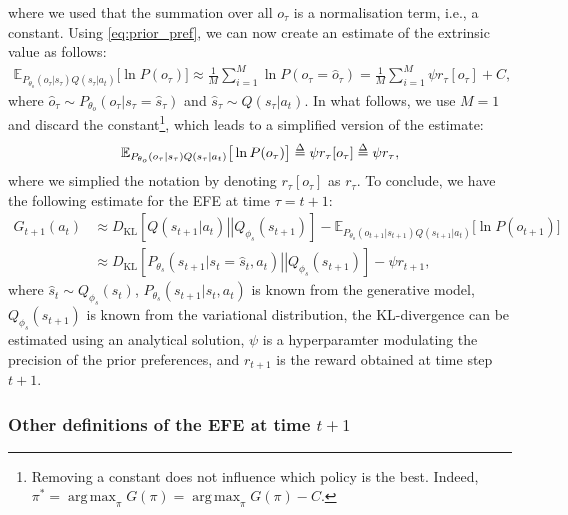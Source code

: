 \documentclass[twoside,11pt]{article}
\newcommand{\kl}[2]{D_{\mathrm{KL}} \left[ \left. \left. #1 \right|\right| #2 \right] }
\DeclareMathOperator*{\argmax}{arg\,max}
\def\delequal{\mathrel{\ensurestackMath{\stackon[1pt]{=}{\scriptstyle\Delta}}}}
\begin{document}
where we used that the summation over all $o_\tau$ is a normalisation term, i.e., a constant. Using \eqref{eq:prior_pref}, we can now create an estimate of the extrinsic value as follows:
\begin{align*}
\mathbb{E}_{P_{\theta_o}(o_\tau|s_\tau)Q(s_\tau | a_t)}\big[\ln P(o_\tau)\big] \approx \frac{1}{M} \sum_{i = 1}^M \ln P(o_\tau = \hat{o}_\tau) = \frac{1}{M} \sum_{i = 1}^M \psi r_\tau[o_\tau] + C,
\end{align*}
where $\hat{o}_\tau \sim P_{\theta_o}(o_\tau|s_\tau=\hat{s}_\tau)$ and $\hat{s}_\tau \sim Q(s_\tau | a_t)$. In what follows, we use $M=1$ and discard the constant\footnote{Removing a constant does not influence which policy is the best. Indeed, $\pi^* = \argmax_\pi G(\pi) = \argmax_\pi G(\pi) - C$.}, which leads to a simplified version of the estimate:
\begin{align*}
\mathbb{E}_{P_{\theta_o}(o_\tau|s_\tau)Q(s_\tau | a_t)}\big[\ln P(o_\tau)\big] \delequal \psi r_\tau[o_\tau] \delequal \psi r_\tau,
\end{align*}
where we simplied the notation by denoting $r_\tau[o_\tau]$ as $r_\tau$. To conclude, we have the following estimate for the EFE at time $\tau = t+1$:
\begin{align}
G_{t+1}(a_t) &\approx \kl{Q(s_{t+1} | a_t)}{Q_{\phi_s}(s_{t+1})} - \mathbb{E}_{P_{\theta_o}(o_{t+1}|s_{t+1})Q(s_{t+1} | a_t)}\big[\ln P(o_{t+1})\big]\nonumber\\
&\approx \kl{P_{\theta_s}(s_{t+1}|s_t = \hat{s}_t, a_t)}{Q_{\phi_s}(s_{t+1})} - \psi r_{t+1},
\end{align}
where $\hat{s}_t \sim Q_{\phi_s}(s_t)$, $P_{\theta_s}(s_{t+1}|s_t, a_t)$ is known from the generative model, $Q_{\phi_s}(s_{t+1})$ is known from the variational distribution, the KL-divergence can be estimated using an analytical solution, $\psi$ is a hyperparamter modulating the precision of the prior preferences, and $r_{t+1}$ is the reward obtained at time step $t+1$.

\subsubsection{Other definitions of the EFE at time $t + 1$} \label{ssec:efe_other_defe}
\end{document}
